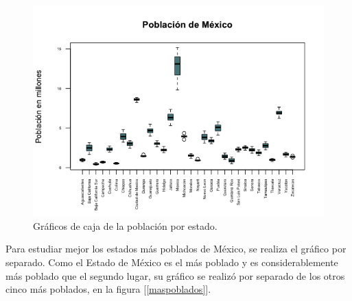 \documentclass[12pt,letterpaper]{article}
\begin{document}
\begin{figure}[h!]
\centering
\includegraphics[scale=0.7]{estados.png}
\caption{Gráficos de caja de la población por estado.}
\label{Estados}
\end{figure}
\newpage
Para estudiar mejor los estados más poblados de México, se realiza el gráfico por separado. Como el Estado de México es el más poblado y es considerablemente más poblado que el segundo lugar, su gráfico se realizó por separado de los otros cinco más poblados, en la figura [\ref{maspoblados}].
\end{document}
